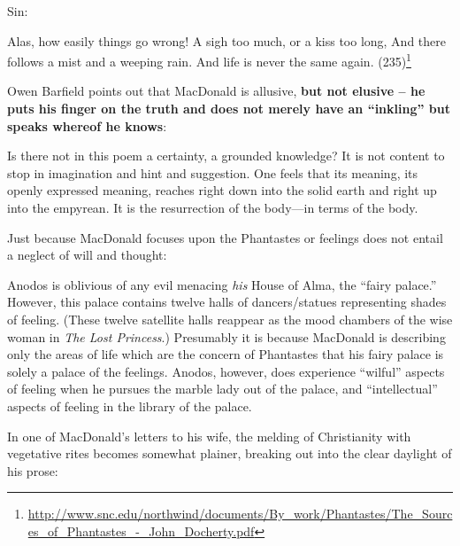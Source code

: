 Sin:

\begin{quotex}
Alas, how easily things go wrong! A sigh too much, or a kiss too long, And there follows a mist and a weeping rain. And life is never the same again. (235)\footnote{\url{http://www.snc.edu/northwind/documents/By\_work/Phantastes/The\_Sources\_of\_Phantastes\_-\_John\_Docherty.pdf}}
\end{quotex}

Owen Barfield points out that MacDonald is allusive, \textbf{but not elusive -- he puts his finger on the truth and does not merely have an ``inkling'' but speaks whereof he knows}:

\begin{quotex}
Is there not in this poem a certainty, a grounded knowledge? It is not content to stop in imagination and hint and suggestion. One feels that its meaning, its openly expressed meaning, reaches right down into the solid earth and right up into the empyrean. It is the resurrection of the body---in terms of the body.
\end{quotex}


Just because MacDonald focuses upon the Phantastes or feelings does not entail a neglect of will and thought:

\begin{quotex}
Anodos is oblivious of any evil menacing \emph{his} House of Alma, the ``fairy palace.'' However, this palace contains twelve halls of dancers/statues representing shades of feeling. (These twelve satellite halls reappear as the mood chambers of the wise woman in \emph{The Lost Princess}.) Presumably it is because MacDonald is describing only the areas of life which are the concern of Phantastes that his fairy palace is solely a palace of the feelings. Anodos, however, does experience ``wilful'' aspects of feeling when he pursues the marble lady out of the palace, and ``intellectual'' aspects of feeling in the library of the palace.
\end{quotex}


In one of MacDonald's letters to his wife, the melding of Christianity with vegetative rites becomes somewhat plainer, breaking out into the clear daylight of his prose: 

